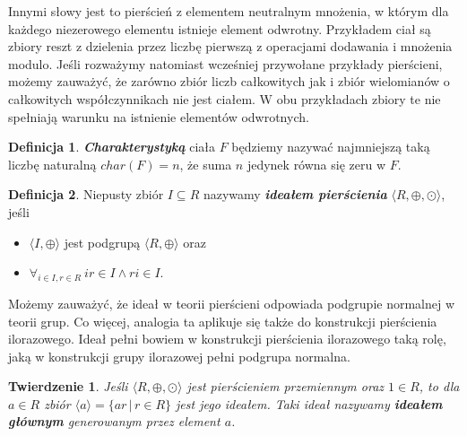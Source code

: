 \documentclass[polish,declaration,shortabstract]{iithesis}
\theoremstyle{definition}
\newtheorem{definition}{Definicja}
\theoremstyle{remark} \newtheorem{observation}{Obserwacja}
\theoremstyle{plain} \newtheorem{theorem}{Twierdzenie}
\theoremstyle{plain} \newtheorem{lemma}{Lemat}
\theoremstyle{remark} \newtheorem*{remark*}{Uwaga}
\theoremstyle{reminder} \newtheorem*{reminder*}{Przypomnienie}
\begin{document}
Innymi słowy jest to pierścień z elementem neutralnym mnożenia, w którym dla każdego niezerowego elementu istnieje element odwrotny. Przykładem ciał są zbiory reszt z dzielenia przez liczbę pierwszą z operacjami dodawania i mnożenia modulo. Jeśli rozważymy natomiast wcześniej przywołane przykłady pierścieni, możemy zauważyć, że zarówno zbiór liczb całkowitych jak i zbiór wielomianów o całkowitych współczynnikach nie jest ciałem. W obu przykładach zbiory te nie spełniają warunku na istnienie elementów odwrotnych.

\begin{definition}
	\textbf{\textit{Charakterystyką}} ciała $F$ będziemy nazywać najmniejszą taką liczbę naturalną $char(F) = n$, że suma $n$ jedynek równa się zeru w $F$.
\end{definition}

\theoremstyle{definition}
\begin{definition}
	Niepusty zbiór $I \subseteq R$ nazywamy \textbf{\textit{ideałem pierścienia}} $\langle R, \oplus, \odot \rangle$, jeśli
	\begin{itemize}[leftmargin=.5in]
		\item $\langle I, \oplus \rangle$ jest podgrupą $\langle R, \oplus \rangle$ oraz
		\item $\forall_{i \in I, r \in R} \: ir \in I \wedge ri \in I $.
	\end{itemize}
\end{definition}

Możemy zauważyć, że ideał w teorii pierścieni odpowiada podgrupie normalnej w teorii grup. Co więcej, analogia ta aplikuje się także do konstrukcji pierścienia ilorazowego. Ideał pełni bowiem w konstrukcji pierścienia ilorazowego taką rolę, jaką w konstrukcji grupy ilorazowej pełni podgrupa normalna.

\theoremstyle{theorem}
\begin{theorem}
	Jeśli $\langle R, \oplus, \odot \rangle$ jest pierścieniem przemiennym oraz $1 \in R$, to dla $a \in R$ zbiór $\langle a \rangle = \{ ar \, | \, r \in R  \}$ jest jego ideałem. Taki ideał nazywamy \textit{\textbf{ideałem głównym}} generowanym przez element $a$.
\end{theorem}
\end{document}
